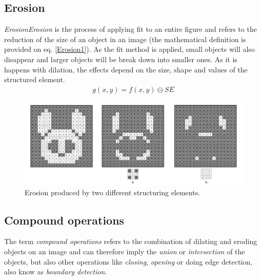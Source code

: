 \subsection{Erosion}
\textit{ErosionErosion} is the process of applying fit to an entire figure and refers to the reduction of the size of an object in an image (the mathematical definition is provided on eq. \ref{Erosion1}). As the fit method is applied, small objects will also disappear and larger objects will be break down into smaller ones. As it is happens with dilation, the effects depend on the size, shape and values of the structured element.
\begin{equation}
\begin{aligned}
{g(x, y)}={f(x,y)}\ominus{SE}
\label{Erosion1}
	\end{aligned}
\end{equation}

\begin{figure}[htbp]
\centering
\includegraphics[width=1\textwidth]{Pictures/Theory/Erosion.png}
\caption{Erosion produced by two different structuring elements.}
\label{fig:Erosion}
\end{figure}

\subsection{Compound operations}
The term \textit{compound operations} refers to the combination of dilating and eroding objects on an image and can therefore imply the \textit{union} or \textit{intersection} of the objects, but also other operations like \textit{closing}, \textit{opening} or doing edge detection, also know as \textit{boundary detection}.
